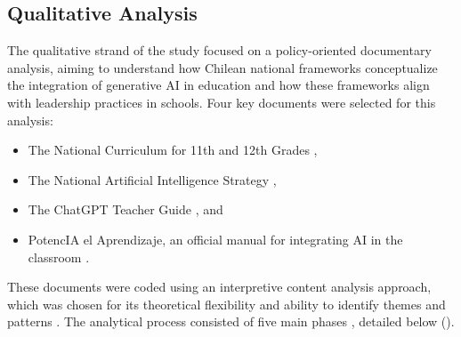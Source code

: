 \documentclass[english]{textolivre}
\begin{document}
\subsection{Qualitative Analysis}
The qualitative strand of the study focused on a policy-oriented documentary analysis, aiming to understand how Chilean national frameworks conceptualize the integration of generative AI in education and how these frameworks align with leadership practices in schools. Four key documents were selected for this analysis:

\begin{itemize}
    \item The National Curriculum for 11th and 12th Grades \cite{mineduc2019bases},
    \item The National Artificial Intelligence Strategy \cite{gobiernochile2024enia},
    \item The ChatGPT Teacher Guide \cite{mineduc2023chatgpt}, and
    \item PotencIA el Aprendizaje, an official manual for integrating AI in the classroom \cite{mineducchile2025potencia}.
\end{itemize}
    
These documents were coded using an interpretive content analysis approach, which was chosen for its theoretical flexibility and ability to identify themes and patterns \cite{saldana2010coding}. The analytical process consisted of five main phases \cite{braun2006thematic}, detailed below ().
\end{document}
